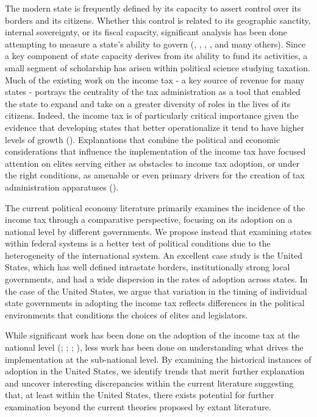\documentclass[letter, 12pt]{article}
\begin{document}
The modern state is frequently defined by its capacity to assert control over its borders and its citizens. Whether this control is related to its geographic sanctity, internal sovereignty, or its fiscal capacity, significant analysis has been done attempting to measure a state’s ability to govern (\citealt{hendrix2010measuring}, \citealt{hanson2013leviathan}, \citealt{ottervik2013conceptualizing}, \citealt{berry1997measuring}, and many others). Since a key component of state capacity derives from its ability to fund its activities, a small segment of scholarship has arisen within political science studying taxation.  Much of the existing work on the income tax - a key source of revenue for many states - portrays the centrality of the tax administration as a tool that enabled the state to expand and take on a greater diversity of roles in the lives of its citizens. Indeed, the income tax is of particularly critical importance given the evidence that developing states that better operationalize it tend to have higher levels of growth (\citealt{moore2004revenues}). Explanations that combine the political and economic considerations that influence the implementation of the income tax have focused attention on elites serving either as obstacles to income tax adoption, or under the right conditions, as amenable or even primary drivers for the creation of tax administration apparatuses (\citealt{mares2015non}).

The current political economy literature primarily examines the incidence of the income tax through a comparative perspective, focusing on its adoption on a national level by different governments. We propose instead that examining states within federal systems is a better test of political conditions due to the heterogeneity of the international system. An excellent case study is the United States, which has well defined intrastate borders, institutionally strong local governments, and had a wide dispersion in the rates of adoption across states.  In the case of the United States, we argue that variation in the timing of individual state governments in adopting the income tax reflects differences in the political environments that conditions the choices of elites and legislators.

While significant work has been done on the adoption of the income tax at the national level (\citealt{mares2015non}; \citealt{ardanaz2013inequality}; \citealt{beramendi2014electoral}; \citealt{scheve2010conscription}), less work has been done on understanding what drives the implementation at the sub-national level. By examining the historical instances of adoption in the United States, we identify trends that merit further explanation and uncover interesting discrepancies within the current literature suggesting that, at least within the United States, there exists potential for further examination beyond the current theories proposed by extant literature.
\end{document}
